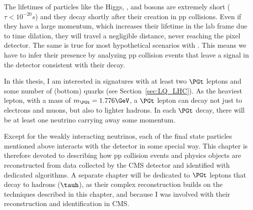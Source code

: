 
 \label{sec:objects}

The lifetimes of particles like the Higgs, {\PW}, and {\PZ} bosons are extremely short ($\tau<10^{-20}\unit{s}$) and they decay shortly after their creation in pp collisions. Even if they have a large momentum, which increases their lifetime in the lab frame due to time dilation, they will travel a negligible distance, never reaching the pixel detector.
The same is true for most hypothetical scenarios with {\LQs}. This means we have to infer their presence by analyzing pp collision events that leave a signal in the detector consistent with their decay.

In this thesis, I am interested in {\LQ} signatures with at least two $\PGt$ leptons and some number of (bottom) quarks (see Section~\ref{sec:LQ_LHC}).
As the heaviest lepton, with a mass of $m_\PGt = 1.776\GeV$, a $\PGt$ lepton can decay not just to electrons and muons, but also to lighter hadrons. In each $\PGt$ decay, there will be at least one neutrino carrying away some momentum. %

Except for the weakly interacting neutrinos, each of the final state particles mentioned above interacts with the detector in some special way.
This chapter is therefore devoted to describing how pp collision events and physics objects are reconstructed from data collected by the CMS detector and identified with dedicated algorithms.
A separate chapter will be dedicated to $\PGt$ leptons that decay to hadrons ($\tauh$), as their complex reconstruction builds on the techniques described in this chapter, and because I was involved with their reconstruction and identification in CMS. %


